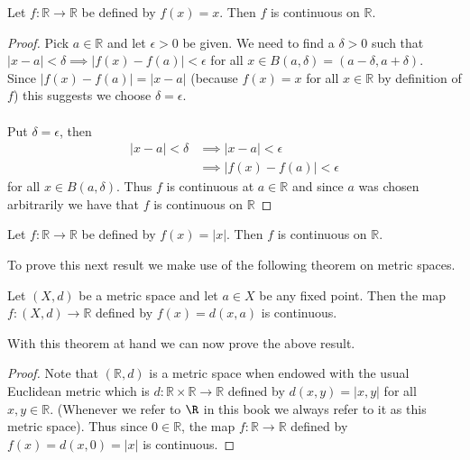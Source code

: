 	 \begin{result}
	 	Let $f : \mathbb{R} \to \mathbb{R}$ be defined by $f(x) = x$. Then $f$ is continuous on $\mathbb{R}$. 
	 \end{result}
	 
	 \begin{proof}
	 	Pick $a \in \mathbb{R}$ and let $\epsilon > 0$ be given. We need to find a $\delta > 0$ such that $|x-a| < \delta \implies |f(x)-f(a)| < \epsilon$ for all $x \in B(a, \delta) = (a- \delta, a+ \delta)$. \\
	 	
	 	Since $|f(x) - f(a)| = |x-a|$ (because $f(x) =  x$ for all $x \in \mathbb{R}$ by definition of $f$) this suggests we choose $\delta = \epsilon$. \\ \\
	 	Put $\delta = \epsilon$, then 	 	\begin{align*}	 	
		 	|x-a| < \delta &\implies |x-a| < \epsilon \\
		 	&\implies  |f(x) - f(a)| < \epsilon
	 	\end{align*}
	 	for all $x \in B(a, \delta)$. Thus $f$ is continuous at $a \in \mathbb{R}$ and since $a$ was chosen arbitrarily we have that $f$ is continuous on $\mathbb{R}$
	 \end{proof}
	 
	 \hrulefill
	 
	  \begin{result}
	  	Let $f : \mathbb{R} \to \mathbb{R}$ be defined by $f(x) = |x|$. Then $f$ is continuous on $\mathbb{R}$. 
	  \end{result}
	  
	  To prove this next result we make use of the following theorem on metric spaces.
	 
	 \begin{theorem}
	 	Let $(X, d)$ be a metric space and let $a \in X$ be any fixed point. Then the map $f : (X, d) \to \mathbb{R}$ defined by $f(x) = d(x, a)$ is continuous.
	 \end{theorem}
	 
	 With this theorem at hand we can now prove the above result.
	 
	 \begin{proof}
	 	Note that $(\mathbb{R}, d)$ is a metric space when endowed with the usual Euclidean metric which is $d : \mathbb{R} \times \mathbb{R} \to \mathbb{R}$ defined by $d(x, y) = |x, y|$ for all $x, y \in \mathbb{R}$. (Whenever we refer to $\R$ in this book we always refer to it as this metric space). Thus since $0 \in \mathbb{R}$, the map $f : \mathbb{R} \to \mathbb{R}$ defined by $f(x) = d(x, 0) = |x|$ is continuous.
	 \end{proof}
	 
